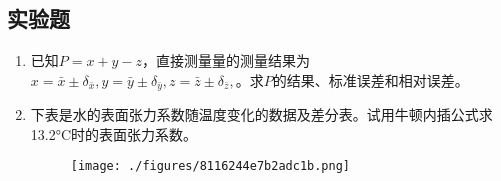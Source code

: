 \subsection{实验题}
\begin{enumerate}
\item 已知$P=x+y-z$，直接测量量的测量结果为$x=\bar x \pm \delta_{\bar x},y=\bar y \pm \delta_{\bar y},z=\bar z \pm \delta_{\bar z},$。求$P$的结果、标准误差和相对误差。
\item 下表是水的表面张力系数随温度变化的数据及差分表。试用牛顿内插公式求13.2°C时的表面张力系数。
\begin{figure}[ht]
\centering
\texttt{[image: ./figures/8116244e7b2adc1b.png]}
\caption{} \label{fig_SY19_2}
\end{figure}
\end{enumerate}